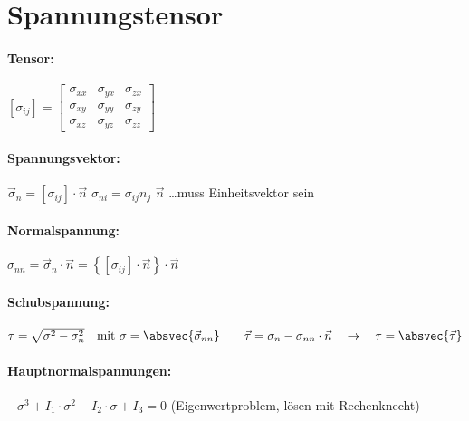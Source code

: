 
\section{Spannungstensor}

\paragraph{ Tensor:} 
	$ \left[\sigma_{ij}\right]
		=\left[\begin{matrix}
			\sigma_{xx} & \sigma_{yx} & \sigma_{zx} \\
			\sigma_{xy} & \sigma_{yy} & \sigma_{zy} \\
			\sigma_{xz} & \sigma_{yz} & \sigma_{zz}
		\end{matrix}\right]
	$

\paragraph{ Spannungsvektor:}
	$ \vec{\sigma}_n = \left[\sigma_{ij}\right]\cdot\vec{n} $
		\quad $ \sigma_{ni} = \sigma_{ij} n_j  $ 
		\qquad $ \vec{n} $ \dots muss Einheitsvektor sein
		
\paragraph{ Normalspannung:}
	$ \sigma_{nn} = \vec{\sigma}_n\cdot\vec{n} 
		= \left\{  [\sigma_{ij}] \cdot \vec{n}  \right\} \cdot \vec{n} $ 

\paragraph{ Schubspannung:}
	$ \tau = \sqrt{\sigma^2 - \sigma_n^2} 
		\quad \text{mit } \sigma = \absvec{\vec{\sigma}_{nn}}
		\qquad \vec{\tau} = \sigma_n - \sigma_{nn} \cdot \vec{n} 
		\quad  \rightarrow
		\quad \tau = \absvec{\vec{\tau}}
	$
	
\paragraph{ Hauptnormalspannungen:}
	$ 	- \sigma^3 + I_1 \cdot \sigma^2 - I_2 \cdot \sigma + I_3 = 0 $ \quad (Eigenwertproblem, lösen mit Rechenknecht)
	

